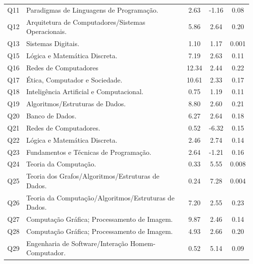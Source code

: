 \documentclass[12pt]{article}
\begin{document}
\begin{table}[htbp]
\begin{tabular}{c|l|c|c|c}
  Q11       & Paradigmas de Linguagens de Programação.             &  2.63       &  -1.16    &  0.08     \\
  Q12       & Arquitetura de Computadores/Sistemas Operacionais.   &  5.86       &  2.64     &  0.20    \\
  Q13       & Sistemas Digitais.                                   &  1.10       &  1.17     &  0.001     \\
  Q15       & Lógica e Matemática Discreta.                        &  7.19       &  2.63     &  0.11     \\
  Q16       & Redes de Computadores                                &  12.34      &  2.44     &  0.22    \\
  Q17       & Ética, Computador e Sociedade.                       &  10.61      &  2.33     &  0.17    \\
  Q18       & Inteligência Artificial e Computacional.             &  0.75       &  1.19     &  0.11    \\
  Q19       & Algoritmos/Estruturas de Dados.                      &  8.80       &  2.60     &  0.21     \\
  Q20       & Banco de Dados.                                      &  6.27       &  2.64     &  0.18     \\
  Q21       & Redes de Computadores.                               &   0.52      &  -6.32    &  0.15     \\
  Q22       & Lógica e Matemática Discreta.                        &  2.46       &   2.74    &  0.14     \\
  Q23       & Fundamentos e Técnicas de Programação.               &  2.64      &   -1.21   &  0.16     \\
  Q24       & Teoria da Computação.                                &  0.33       &   5.55    &  0.008   \\
  Q25       & Teoria dos Grafos/Algoritmos/Estruturas de Dados.    &  0.24       &   7.28    &  0.004   \\
  Q26       & Teoria da Computação/Algoritmos/Estruturas de Dados. &  7.20       &   2.55    &  0.23   \\
  Q27       & Computação Gráfica; Processamento de Imagem.         &  9.87       &   2.46    &  0.14   \\
  Q28       & Computação Gráfica; Processamento de Imagem.         &  4.93       &   2.66    &  0.20  \\
  Q29       & Engenharia de Software/Interação Homem-Computador.   &  0.52       &   5.14    &  0.09  \\

\end{tabular}
\end{table}
\end{document}

